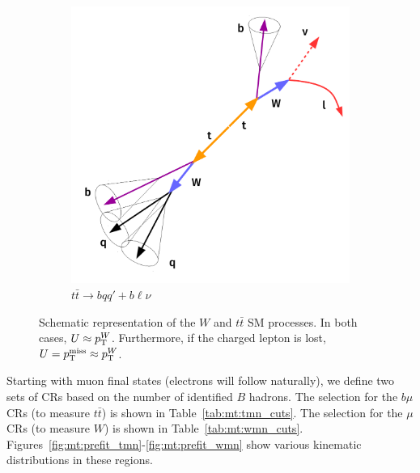 \begin{figure}[]
\begin{center}
\begin{subfigure}[t]{0.49\textwidth}
            \includegraphics[width=\textwidth]{figures/monotop/diagrams/ttcr.pdf}
            \caption{$t\bar{t}\rightarrow bqq'+b\ell\nu$}
        \end{subfigure}
        \caption{Schematic representation of the $W$ and $t\bar{t}$ SM processes. 
                 In both cases, $U\approx p_\mathrm{T}^W$.
                 Furthermore, if the charged lepton is lost, $U = p_\mathrm{T}^\mathrm{miss} \approx p_\mathrm{T}^W$.}
        \label{fig:mt:wtt}
    \end{center}
\end{figure}

Starting with muon final states (electrons will follow naturally), we define two sets of CRs based on the number of identified $B$ hadrons.
The selection for the $b\mu$ CRs (to measure $t\bar{t}$) is shown in Table~\ref{tab:mt:tmn_cuts}.
The selection for the $\mu$ CRs (to measure $W$) is shown in Table~\ref{tab:mt:wmn_cuts}.
Figures~\ref{fig:mt:prefit_tmn}-\ref{fig:mt:prefit_wmn} show various kinematic distributions in these regions. 

